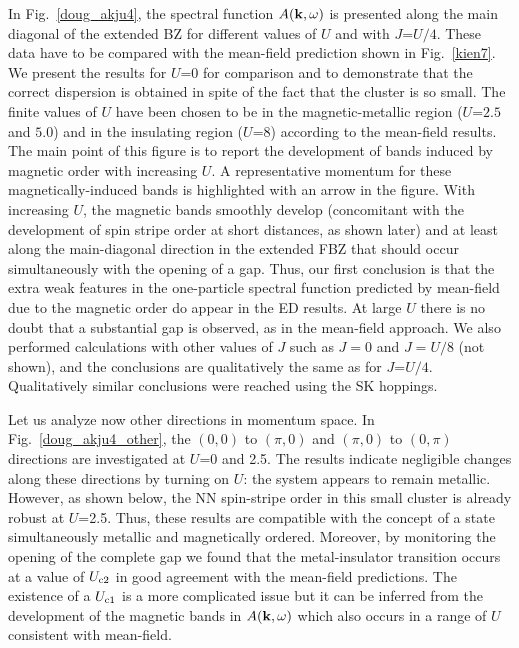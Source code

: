 \documentclass[aps,prb,superscriptaddress,preprintnumbers,
showpacs,legalpaper,twoside,twocolumn,amsmath,amssymb]{revtex4}
\begin{document}
In Fig.~\ref{doug_akju4}, the spectral function
$A({\bf k},\omega)$ is presented along the main diagonal
of the extended BZ for different values of $U$ and with $J$=$U/4$.
These data have to be compared with the mean-field prediction shown in
Fig.~\ref{kien7}.
We present the results for $U$=$0$ for comparison and to demonstrate that the
correct dispersion is obtained in spite of the fact that the cluster is so small.
The finite values
of $U$ have been chosen to be in the magnetic-metallic region ($U$=$2.5$ and $5.0$) and
in the insulating region ($U$=$8$) according to the mean-field results. The main point
of this figure is to report the development of bands induced by magnetic order with increasing $U$. A
representative momentum for these magnetically-induced bands is highlighted
with an arrow in the figure.
With increasing $U$, the magnetic bands smoothly develop (concomitant with
the development of spin stripe order at short distances, as shown later) and at least
along the main-diagonal direction in the extended FBZ that should occur simultaneously
with the opening of a gap.
Thus, our first conclusion is that the extra weak features in the one-particle spectral
function predicted by mean-field due to
the magnetic order do appear in the ED results. At large $U$ there is
no doubt that a substantial gap is observed, as in the mean-field approach.
We also performed calculations with other values of $J$ such as
$J=0$ and $J=U/8$ (not shown), and the conclusions are qualitatively the same
as for $J$=$U/4$. Qualitatively similar conclusions were reached using
the SK hoppings.\cite{daghofer}

Let us analyze now other directions in momentum space. In Fig.~\ref{doug_akju4_other},
the $(0,0)$ to $(\pi,0)$ and $(\pi,0)$ to $(0,\pi)$ directions are investigated
at $U$=0 and 2.5. The results indicate negligible changes along these
directions by turning on $U$: the system appears to remain metallic.
However, as shown below, the NN spin-stripe order
in this small cluster is already robust at $U$=2.5.
Thus, these results are
compatible with the concept of a state simultaneously metallic and magnetically
ordered.
Moreover, by monitoring the
opening of the complete gap we found that the metal-insulator transition occurs
at a value of $U_{\rm c2}$ in good agreement with the mean-field predictions.
The existence of a
$U_{\rm c1}$ is a more complicated issue but it can be inferred from
the development of the magnetic bands in
$A({\bf k},\omega)$ which also occurs in a range of $U$ consistent with
mean-field.
\end{document}
